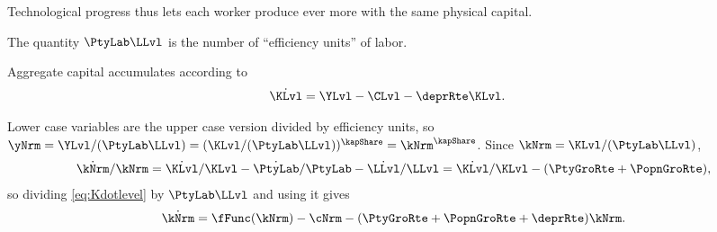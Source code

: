\documentclass{econark}
\begin{document}
Technological progress thus lets each worker produce ever more with the same physical capital.

The quantity $\PtyLab \LLvl$ is the number of ``efficiency units'' of labor.

Aggregate capital accumulates according to
\begin{equation}\begin{gathered}\begin{aligned}
  \dot{\KLvl} & =  \YLvl - \CLvl - \deprRte \KLvl \label{eq:Kdotlevel}.
\end{aligned}\end{gathered}\end{equation}

Lower case variables are the upper case version divided by efficiency units, so $\yNrm = \YLvl/(\PtyLab \LLvl) = (\KLvl/(\PtyLab \LLvl))^{\kapShare} = \kNrm^{\kapShare}$. Since $\kNrm = \KLvl/(\PtyLab \LLvl)$,
\begin{equation}
  \dot{\kNrm}/\kNrm = \dot{\KLvl}/\KLvl - \dot{\PtyLab}/\PtyLab - \dot{\LLvl}/\LLvl = \dot{\KLvl}/\KLvl - (\PtyGroRte +\PopnGroRte),
\end{equation}
so dividing \eqref{eq:Kdotlevel} by $\PtyLab \LLvl$ and using it gives
\begin{equation}
  \dot{\kNrm} = \fFunc(\kNrm) - \cNrm - (\PtyGroRte +\PopnGroRte+\deprRte) \kNrm . \label{eq:RCK-kdot}
\end{equation}
\end{document}
